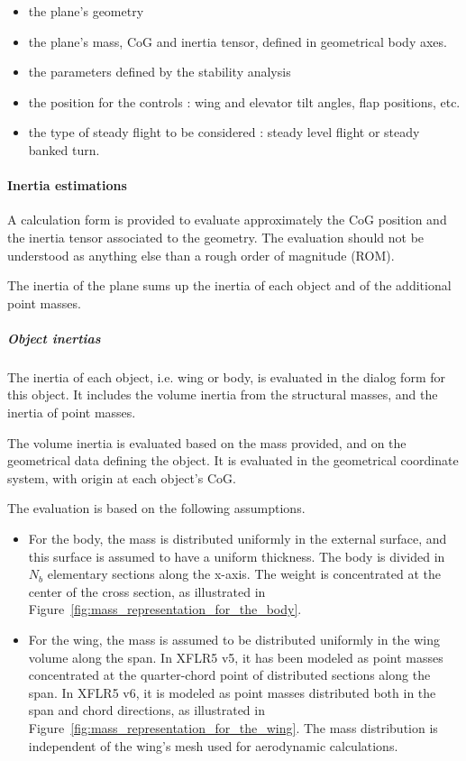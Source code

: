 \documentclass[a4paper,twoside,12pt,dvips]{article}
\begin{document}
\begin{itemize}
\item the plane's geometry
\item the plane's mass, CoG and inertia tensor, defined in geometrical
body axes.
\item the parameters defined by the stability analysis
\item the position for the controls : wing and elevator tilt angles,
flap positions, etc.
\item the type of steady flight to be considered : steady level flight
or steady banked turn.
\end{itemize}

\paragraph{Inertia estimations}

A calculation form is provided to evaluate approximately the CoG
position and the inertia tensor associated to the geometry. The
evaluation should not be understood as anything else than a rough
order of magnitude (ROM).

The inertia of the plane sums up the inertia of each object and of the
additional point masses.

\subparagraph{Object inertias}

The inertia of each object, i.e. wing or body, is evaluated in the
dialog form for this object. It includes the volume inertia from the
structural masses, and the inertia of point masses.

The volume inertia is evaluated based on the mass provided, and on the
geometrical data defining the object. It is evaluated in the
geometrical coordinate system, with origin at each object's CoG.

The evaluation is based on the following assumptions.

\begin{itemize}
\item For the body, the mass is distributed uniformly in the external
surface, and this surface is assumed to have a uniform thickness. The
body is divided in $N_b$ elementary sections along the x-axis. The
weight is concentrated at the center of the cross section, as
illustrated in Figure~\ref{fig:mass_representation_for_the_body}.
\item For the wing, the mass is assumed to be distributed uniformly in
the wing volume along the span.\newline
In XFLR5 v5, it has been modeled as point masses concentrated at the
quarter-chord point of distributed sections along the span.\newline
In XFLR5 v6, it is modeled as point masses distributed both in the
span and chord directions, as illustrated in
Figure~\ref{fig:mass_representation_for_the_wing}. The mass
distribution is independent of the wing's mesh used for aerodynamic
calculations.
\end{itemize}
\end{document}
